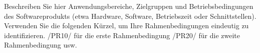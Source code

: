 %                                                                              
%                                                                              
Beschreiben Sie hier Anwendungsbereiche, Zielgruppen und Betriebsbedingungen des Softwareprodukts (etwa Hardware, Software, Betriebszeit oder Schnittstellen).\\

Verwenden Sie die folgenden Kürzel, um Ihre Rahmenbedingungen eindeutig zu identifizieren.
/PR10/ für die erste Rahmenbedingung
/PR20/ für die zweite Rahmenbedingung
usw.
